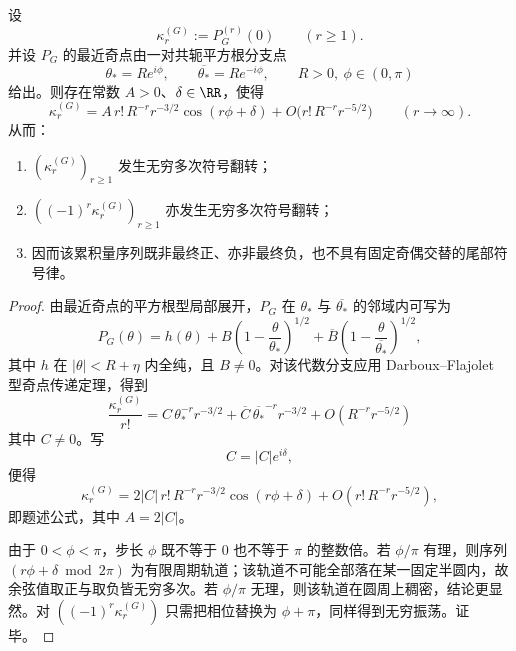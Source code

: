 \begin{theorem}[规范差高阶累积量的振荡符号律]\label{thm:conclusion-realinput40-gauge-difference-cumulant-sign-oscillation}
设
\[
\kappa_r^{(G)}:=P_G^{(r)}(0)
\qquad (r\ge 1).
\]
并设 \(P_G\) 的最近奇点由一对共轭平方根分支点
\[
\theta_*=Re^{i\phi},
\qquad
\overline{\theta_*}=Re^{-i\phi},
\qquad
R>0,\ \phi\in(0,\pi)
\]
给出。则存在常数 \(A>0\)、\(\delta\in\RR\)，使得
\[
\kappa_r^{(G)}
=
A\,r!\,R^{-r}r^{-3/2}\cos(r\phi+\delta)+O\!\bigl(r!\,R^{-r}r^{-5/2}\bigr)
\qquad (r\to\infty).
\]
从而：
\begin{enumerate}
  \item \((\kappa_r^{(G)})_{r\ge 1}\) 发生无穷多次符号翻转；
  \item \(((-1)^r\kappa_r^{(G)})_{r\ge 1}\) 亦发生无穷多次符号翻转；
  \item 因而该累积量序列既非最终正、亦非最终负，也不具有固定奇偶交替的尾部符号律。
\end{enumerate}
\end{theorem}
\begin{proof}
由最近奇点的平方根型局部展开，\(P_G\) 在 \(\theta_*\) 与 \(\overline{\theta_*}\) 的邻域内可写为
\[
P_G(\theta)
=
h(\theta)
+B\left(1-\frac{\theta}{\theta_*}\right)^{1/2}
+\overline{B}\left(1-\frac{\theta}{\overline{\theta_*}}\right)^{1/2},
\]
其中 \(h\) 在 \(|\theta|<R+\eta\) 内全纯，且 \(B\neq 0\)。对该代数分支应用 Darboux--Flajolet 型奇点传递定理，得到
\[
\frac{\kappa_r^{(G)}}{r!}
=
C\,\theta_*^{-r}r^{-3/2}
+\overline{C}\,\overline{\theta_*}^{-r}r^{-3/2}
+O(R^{-r}r^{-5/2})
\]
其中 \(C\neq 0\)。写
\[
C=|C|e^{i\delta},
\]
便得
\[
\kappa_r^{(G)}
=
2|C|\,r!\,R^{-r}r^{-3/2}\cos(r\phi+\delta)
+O(r!\,R^{-r}r^{-5/2}),
\]
即题述公式，其中 \(A=2|C|\)。

由于 \(0<\phi<\pi\)，步长 \(\phi\) 既不等于 \(0\) 也不等于 \(\pi\) 的整数倍。若 \(\phi/\pi\) 有理，则序列 \((r\phi+\delta \bmod 2\pi)\) 为有限周期轨道；该轨道不可能全部落在某一固定半圆内，故余弦值取正与取负皆无穷多次。若 \(\phi/\pi\) 无理，则该轨道在圆周上稠密，结论更显然。对 \(((-1)^r\kappa_r^{(G)})\) 只需把相位替换为 \(\phi+\pi\)，同样得到无穷振荡。证毕。
\end{proof}

